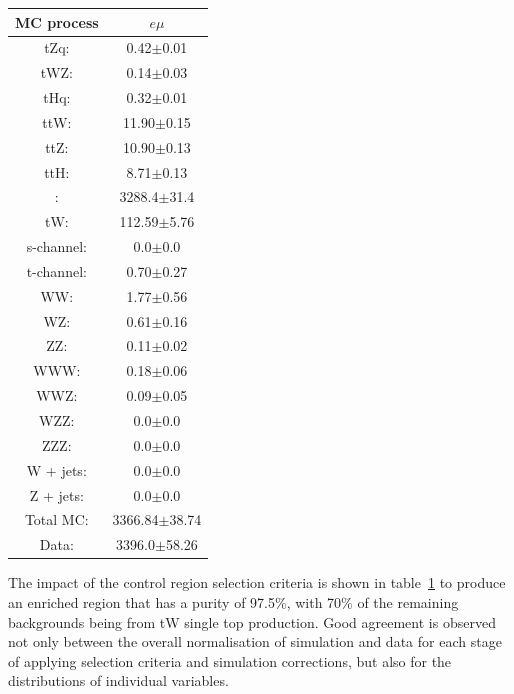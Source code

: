 \begin{table}[htbp]
\label{tab:ttbarCR}
  \centering
 \begin{tabular}{cc}
   \hline
   \textbf{MC process} & \textbf{$e\mu$}  \\
   \hline
	tZq\@: & 0.42$\pm$0.01  \\
	tWZ\@: & 0.14$\pm$0.03  \\
	tHq\@: & 0.32$\pm$0.01  \\
	ttW\@: & 11.90$\pm$0.15   \\
	ttZ\@: & 10.90$\pm$0.13   \\
	ttH\@: & 8.71$\pm$0.13  \\
	\ttbar: & 3288.4$\pm$31.4   \\
	tW\@: & 112.59$\pm$5.76   \\
	s-channel\@: &  0.0$\pm$0.0 \\
	t-channel\@: & 0.70$\pm$0.27 \\
	WW\@: & 1.77$\pm$0.56  \\
	WZ\@: & 0.61$\pm$0.16 \\
	ZZ\@: & 0.11$\pm$0.02 \\
	WWW\@: & 0.18$\pm$0.06     \\
	WWZ\@: & 0.09$\pm$0.05     \\
	WZZ\@: & 0.0$\pm$0.0     \\
	ZZZ\@: & 0.0$\pm$0.0     \\
	W + jets\@: & 0.0$\pm$0.0     \\
	Z + jets\@: & 0.0$\pm$0.0     \\
	\hline
	Total MC\@: & 3366.84$\pm$38.74     \\
	\hline
	Data\@: & 3396.0$\pm$58.26     \\
   \hline
 \end{tabular}
\end{table}

The impact of the \ttbar control region selection criteria is shown in table~\ref{tab:ttbarCR} to produce an enriched region that has a purity of 97.5\%, with 70\% of the remaining backgrounds being from tW single top production.
Good agreement is observed not only between the overall normalisation of simulation and data for each stage of applying selection criteria and simulation corrections, but also for the distributions of individual variables.

